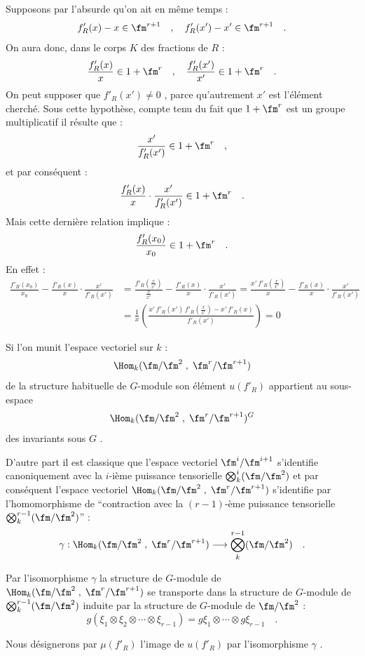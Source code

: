Supposons par l'absurde qu'on ait en même temps :
\[
f'_R(x) - x \in \fm^{r+1} \quad , \quad f'_R(x') - x' \in \fm^{r+1} \quad .
\]
On aura donc, dans le corps $K$ des fractions de $R$ :
\[
\frac{f'_R(x)}{x} \in 1 + \fm^r \quad , \quad \frac{f'_R(x')}{x'} \in 1 + \fm^r \quad .
\]
On peut supposer que $f'_R(x') \neq 0$ , parce qu'autrement $x'$ est l'élément cherché. Sous cette hypothèse, compte tenu du fait que $1 + \fm^r$ est un groupe multiplicatif il résulte que :
\[
\frac{x'}{f'_R(x')} \in 1 + \fm^r \quad ,
\]
et par conséquent :
\[
\frac{f'_R(x)}{x} \cdot \frac{x'}{f'_R(x')} \in 1 + \fm^r \quad .
\]
Mais cette dernière relation implique :
\[
\frac{f'_R(x_0)}{x_0} \in 1 + \fm^r \quad .
\]
En effet :
\[
\begin{aligned}
\frac{f'_R(x_0)}{x_0} - \frac{f'_R(x)}{x} \cdot \frac{x'}{f'_R(x')}
&= \frac{f'_R(\frac{x}{x'})}{\frac{x}{x'}} - \frac{f'_R(x)}{x} \cdot \frac{x'}{f'_R(x')}
= \frac{x'\,f'_R(\frac{x}{x'})}{x} - \frac{f'_R(x)}{x} \cdot \frac{x'}{f'_R(x')} \\
&= \frac{1}{x}\left(\frac{x'\,f'_R(x')\,f'_R(\frac{x}{x'}) - x'\,f'_R(x)}{f'_R(x')}\right) = 0
\end{aligned}
\]

Si l'on
munit l'espace vectoriel sur $k$ :
\[
\Hom_k(\fm/\fm^2 \; , \; \fm^r/\fm^{r+1})
\]
de la structure habituelle de $G$-module son élément $u(f'_R)$ appartient au sous-espace
\[
\Hom_k(\fm/\fm^2 \; , \; \fm^r/\fm^{r+1})^G
\]
des invariants sous $G$ .

D'autre part il est classique que l'espace vectoriel $\fm^i/\fm^{i+1}$ s'identifie canoniquement avec la $i$-ième puissance tensorielle $\bigotimes_k^i (\fm/\fm^2)$ et par conséquent l'espace vectoriel $\Hom_k(\fm/\fm^2 \; , \; \fm^r/\fm^{r+1})$ s'identifie par l'homomorphisme de ``contraction avec la $(r-1)$-ème puissance tensorielle $\bigotimes_k^{r-1}(\fm/\fm^2)$'' :
\[
\gamma : \Hom_k(\fm/\fm^2 \; , \; \fm^r/\fm^{r+1}) \longrightarrow \bigotimes_k^{r-1}(\fm/\fm^2) \quad .
\]

Par l'isomorphisme $\gamma$ la structure de $G$-module de $\Hom_k(\fm/\fm^2 \; , \; \fm^r/\fm^{r+1})$ se transporte dans la structure de $G$-module de $\bigotimes_k^{r-1}(\fm/\fm^2)$ induite par la structure de $G$-module de $\fm/\fm^2$ :
\[
g(\xi_1 \otimes \xi_2 \otimes \cdots \otimes \xi_{r-1}) = g\xi_1 \otimes \cdots \otimes g\xi_{r-1} \quad .
\]

Nous désignerons par $\mu(f'_R)$ l'image de $u(f'_R)$ par l'isomorphisme $\gamma$ .

